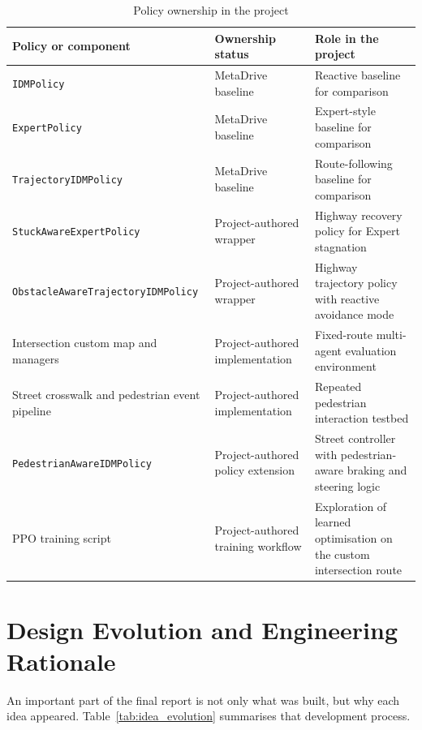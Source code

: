 \documentclass[12pt,a4paper]{report}
\begin{document}
\begin{table}[H]
    \centering
    \small
    \caption{Policy ownership in the project}
    \label{tab:policy_ownership}
    \begin{tabularx}{\textwidth}{>{\raggedright\arraybackslash}p{3.4cm} X X}
        \toprule
        Policy or component & Ownership status & Role in the project \\
        \midrule
        \texttt{IDMPolicy} & MetaDrive baseline & Reactive baseline for comparison \\
        \texttt{ExpertPolicy} & MetaDrive baseline & Expert-style baseline for comparison \\
        \texttt{TrajectoryIDMPolicy} & MetaDrive baseline & Route-following baseline for comparison \\
        \texttt{StuckAwareExpertPolicy} & Project-authored wrapper & Highway recovery policy for Expert stagnation \\
        \texttt{ObstacleAwareTrajectoryIDMPolicy} & Project-authored wrapper & Highway trajectory policy with reactive avoidance mode \\
        Intersection custom map and managers & Project-authored implementation & Fixed-route multi-agent evaluation environment \\
        Street crosswalk and pedestrian event pipeline & Project-authored implementation & Repeated pedestrian interaction testbed \\
        \texttt{PedestrianAwareIDMPolicy} & Project-authored policy extension & Street controller with pedestrian-aware braking and steering logic \\
        PPO training script & Project-authored training workflow & Exploration of learned optimisation on the custom intersection route \\
        \bottomrule
    \end{tabularx}
\end{table}

\section{Design Evolution and Engineering Rationale}
An important part of the final report is not only what was built, but why each idea appeared. Table~\ref{tab:idea_evolution} summarises that development process.
\end{document}
